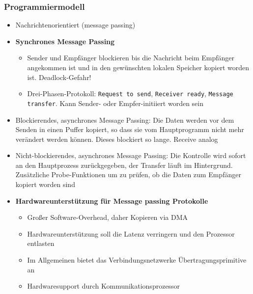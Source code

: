 \subsubsection{Programmiermodell}
\begin{itemize}
	\item Nachrichtenorientiert (message passing)
	\item \textbf{Synchrones Message Passing}
	\begin{itemize}
		\item Sender und Empfänger blockieren bis die Nachricht beim Empfänger angekommen ist und in den gewünschten lokalen Speicher kopiert worden ist. Deadlock-Gefahr!
		\item Drei-Phasen-Protokoll: \texttt{Request to send}, \texttt{Receiver ready}, \texttt{Message transfer}. Kann Sender- oder Empfer-initiiert worden sein
	\end{itemize}
	\item Blockierendes, asynchrones Message Passing: Die Daten werden vor dem Senden in einen Puffer kopiert, so dass sie vom Hauptprogramm nicht mehr verändert werden können. Dieses blockiert so lange. Receive analog
	\item Nicht-blockierendes, asynchrones Message Passing: Die Kontrolle wird sofort an den Hauptprozess zurückgegeben, der Transfer läuft im Hintergrund. Zusätzliche Probe-Funktionen um zu prüfen, ob die Daten zum Empfänger kopiert worden sind
	\item \textbf{Hardwareunterstützung für Message passing Protokolle}
	\begin{itemize}
		\item Großer Software-Overhead, daher Kopieren via DMA
		\item Hardwareunterstützung soll die Latenz verringern und den Prozessor entlasten
		\item Im Allgemeinen bietet das Verbindungsnetzwerke Übertragungsprimitive an
		\item Hardwaresupport durch Kommunikationsprozessor
	\end{itemize}
\end{itemize}

